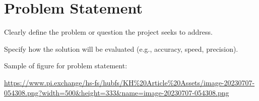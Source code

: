 \section{Problem Statement}
Clearly define the problem or question the project seeks to address.
    
Specify how the solution will be evaluated (e.g., accuracy, speed, precision).


Sample of figure for problem statement:

\url{https://www.pi.exchange/hs-fs/hubfs/KH%20Article%20Assets/image-20230707-054308.png?width=500&height=333&name=image-20230707-054308.png} 